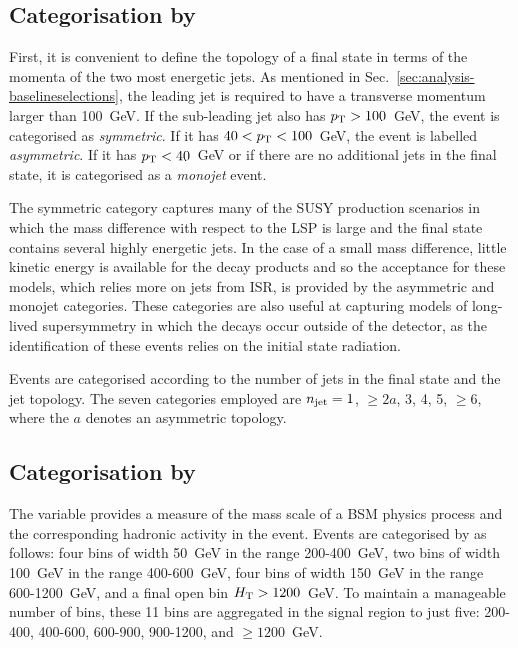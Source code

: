 \subsection*{Categorisation by \njet}

First, it is convenient to define the topology of a final state in terms of the 
momenta of the two most energetic jets. 
As mentioned in Sec.~\ref{sec:analysis-baselineselections}, the leading jet is 
required to have a transverse momentum larger than 100~GeV. 
If the sub-leading jet also has ${p_{\text T}}>100$~GeV, the event is categorised as
\textit{symmetric}. If it has $40<{p_{\text T}}<100$~GeV, the event is labelled 
\textit{asymmetric}. If it has ${p_{\text T}}<40$~GeV or if there are no additional jets 
in the final state, it is categorised as a \textit{monojet} event. 

The symmetric category captures many of the SUSY production scenarios in which 
the mass difference with respect to the LSP is large and the final state 
contains several highly energetic jets. In the case of a small mass difference, 
little kinetic energy is available for the decay products and so the acceptance 
for these models, which relies more on jets from ISR, is provided by the 
asymmetric and monojet categories. 
These categories are also useful at capturing models of long-lived 
supersymmetry in which the decays occur outside of the detector, as the  
identification of these events relies on the initial state radiation.

Events are categorised according to the number of jets in the final state and 
the jet topology. The seven categories employed are $n_{\text{jet}} = 1$, $\geq2a$, 3, 
4, 5, $\geq6$, where the $a$ denotes an asymmetric topology.

\subsection*{Categorisation by \scalht}

The \scalht variable provides a measure of the mass scale of a BSM physics 
process and the corresponding hadronic activity in the event. Events are 
categorised by \scalht as follows: four bins of width 50~GeV in the range 
200-400~GeV, two bins of width 100~GeV in the range 400-600~GeV, four bins of 
width 150~GeV in the range 600-1200~GeV, and a final open bin 
$\mbox{$H_\text{T}$}>1200$~GeV. 
To maintain a manageable number of bins,
these 11 bins are aggregated in the signal region to just five: 200-400, 
400-600, 
600-900, 900-1200, and $\geq1200$~GeV.

